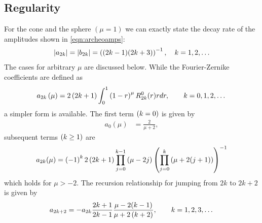 \documentclass[preprint,12pt]{elsarticle}
\begin{document}
\subsection{Regularity}
For the cone and the sphere $(\mu=1)$ we can exactly state the decay rate of the amplitudes shown in \eqref{eqn:archeoamps}: 
  \begin{equation}
    \begin{split}
      \left|a_{2k}\right| = \left|b_{2k}\right| = \left(  (2k - 1 ) ( 2k + 3 )  \right)^{-1}, \quad k = 1, 2, \dots
    \end{split}
  \end{equation}
The cases for arbitrary $\mu$ are discussed below. While the Fourier-Zernike coefficients are defined as
\begin{equation}
    a_{2k}\left( \mu \right) = 2\left( 2k+1 \right) \int_{0}^{1} \left( 1 - r \right)^{\mu} R_{2k}^{0}(r) r dr, \qquad k=0,1,2,\dots
\end{equation}
a simpler form is available. The first term $\left( k=0 \right)$ is given by
\begin{equation}
  \begin{split}
      a_{0}(\mu) &=  \frac{2}{\mu + 2},
  \end{split}
\end{equation}
subsequent terms $\left( k\ge1 \right)$ are
\begin{equation}
    a_{2k}(\mu) = \left( -1 \right)^{k} 2\left( 2k+1 \right) \prod_{j=0}^{k-1}\left( \mu - 2j \right) \left( \prod_{j=0}^{k}\left( \mu + 2(j+1) \right) \right)^{-1}
\end{equation}
which holds for $\mu>-2$. The recursion relationship for jumping from $2k$ to $2k+2$ is given by
  \begin{equation}
      a_{2k+2} = - a_{2k} \frac{2k+1} {2k-1} \frac{\mu - 2(k-1)} {\mu + 2\left( k + 2 \right)}, \qquad k = 1,2,3, \dots
  \end{equation}
\end{document}
